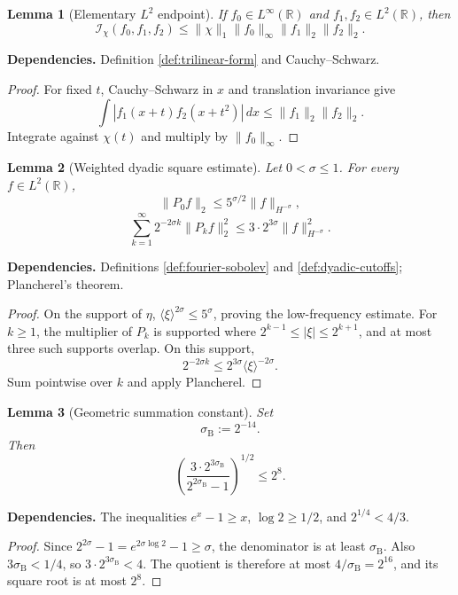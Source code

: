 \documentclass[11pt]{article}
\newtheorem{lemma}[lemma]{Lemma}
\theoremstyle{definition}
\theoremstyle{remark}
\newcommand{\R}{\mathbb R}
\newcommand{\1}{\mathbf 1}
\newcommand{\br}[1]{\langle #1\rangle}
\newcommand{\dd}{\,d}
\newcommand{\Ichi}{\mathcal I_{\chi}}
\newcommand{\hNorm}[2]{\lVert #1\rVert_{H^{#2}}}
\newcommand{\lpNorm}[2]{\lVert #1\rVert_{#2}}
\newcommand{\uses}[1]{\par\smallskip\noindent\textbf{Dependencies.} #1\par\smallskip}
\begin{document}
\begin{lemma}[Elementary $L^2$ endpoint]\label{lem:l2-endpoint}
If $f_0\in L^\infty(\R)$ and $f_1,f_2\in L^2(\R)$, then
\[
\Ichi(f_0,f_1,f_2)
\leq
\lpNorm\chi1\lpNorm{f_0}\infty\lpNorm{f_1}2\lpNorm{f_2}2.
\]
\end{lemma}

\uses{Definition \ref{def:trilinear-form} and Cauchy--Schwarz.}

\begin{proof}
For fixed $t$, Cauchy--Schwarz in $x$ and translation invariance give
\[
\int|f_1(x+t)f_2(x+t^2)|\dd x
\leq\lpNorm{f_1}2\lpNorm{f_2}2.
\]
Integrate against $\chi(t)$ and multiply by $\lpNorm{f_0}\infty$.
\end{proof}

\begin{lemma}[Weighted dyadic square estimate]\label{lem:weighted-dyadic-square}
Let $0<\sigma\leq1$.  For every $f\in L^2(\R)$,
\[
\lpNorm{P_0f}2\leq5^{\sigma/2}\hNorm f{-\sigma},
\]
\[
\sum_{k=1}^\infty2^{-2\sigma k}\lpNorm{P_kf}2^2
\leq3\cdot2^{3\sigma}\hNorm f{-\sigma}^2.
\]
\end{lemma}

\uses{Definitions \ref{def:fourier-sobolev} and \ref{def:dyadic-cutoffs}; Plancherel's theorem.}

\begin{proof}
On the support of $\eta$, $\br\xi^{2\sigma}\leq5^\sigma$, proving the low-frequency estimate.  For $k\geq1$, the multiplier of $P_k$ is supported where
$2^{k-1}\leq|\xi|\leq2^{k+1}$, and at most three such supports overlap.  On this support,
\[
2^{-2\sigma k}\leq2^{3\sigma}\br\xi^{-2\sigma}.
\]
Sum pointwise over $k$ and apply Plancherel.
\end{proof}

\begin{lemma}[Geometric summation constant]\label{lem:geometric-summation}
Set
\[
\sigma_{\mathrm B}:=2^{-14}.
\]
Then
\[
\left(
\frac{3\cdot2^{3\sigma_{\mathrm B}}}
{2^{2\sigma_{\mathrm B}}-1}
\right)^{1/2}
\leq2^8.
\]
\end{lemma}

\uses{The inequalities $e^x-1\geq x$, $\log 2\geq1/2$, and $2^{1/4}<4/3$.}

\begin{proof}
Since $2^{2\sigma}-1=e^{2\sigma\log2}-1\geq\sigma$, the denominator is at least $\sigma_{\mathrm B}$.  Also
$3\sigma_{\mathrm B}<1/4$, so
$3\cdot2^{3\sigma_{\mathrm B}}<4$.  The quotient is therefore at most
$4/\sigma_{\mathrm B}=2^{16}$, and its square root is at most $2^8$.
\end{proof}
\end{document}
